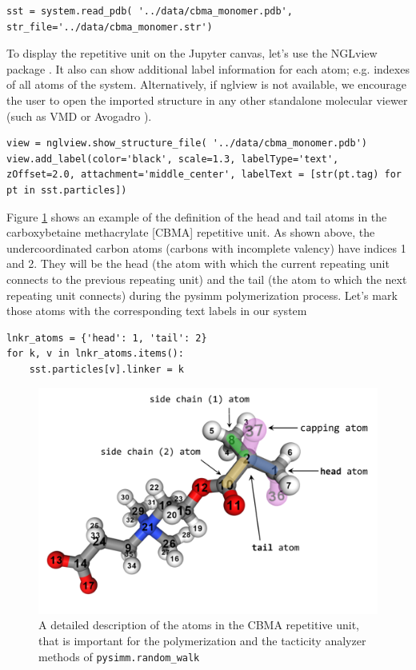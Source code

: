 \documentclass[9pt,tutorial]{livecoms}
\begin{document}
\begin{lstlisting}
sst = system.read_pdb( '../data/cbma_monomer.pdb', str_file='../data/cbma_monomer.str')
\end{lstlisting}

To display the repetitive unit on the Jupyter canvas, let's use the NGLview package \cite{nglview}. It also can show additional label information for each atom; e.g. indexes of all atoms of the system. Alternatively, if nglview is not available, we encourage the user to open the imported structure in any other standalone molecular viewer (such as VMD \cite{vmd} or Avogadro \cite{avogadro}). 

\begin{lstlisting}
view = nglview.show_structure_file( '../data/cbma_monomer.pdb')
view.add_label(color='black', scale=1.3, labelType='text', zOffset=2.0, attachment='middle_center', labelText = [str(pt.tag) for pt in sst.particles])
\end{lstlisting}


Figure \ref{rep-unit} shows an example of the definition of the head and tail atoms in the carboxybetaine methacrylate [CBMA] repetitive unit. As shown above, the undercoordinated carbon atoms (carbons with incomplete valency) have indices 1 and 2. They will be the head (the atom with which the current repeating unit connects to the previous repeating unit) and the tail (the atom to which the next repeating unit connects) during the pysimm polymerization process. Let's mark those atoms with the corresponding text labels in our system

\begin{lstlisting}
lnkr_atoms = {'head': 1, 'tail': 2}
for k, v in lnkr_atoms.items():
    sst.particles[v].linker = k
\end{lstlisting}

\begin{figure}[htbp]
  \centering
    \includegraphics[width=0.9\columnwidth]{figures/figure2_mod}
    \caption{A detailed description of the atoms in the CBMA repetitive unit, that is important for the polymerization and the tacticity analyzer methods of \lstinline$pysimm.random_walk$}
    \label{rep-unit}
\end{figure}
\end{document}
